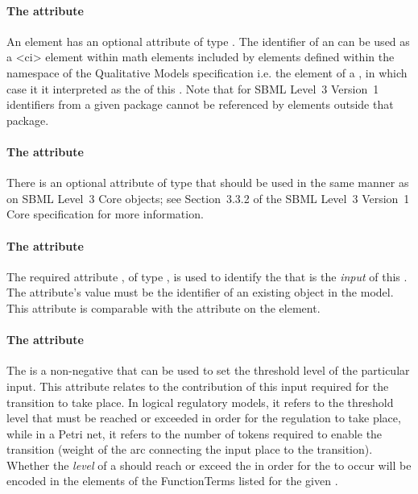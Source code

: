 \paragraph{The  attribute}
An \Input element has an optional  attribute of type . The identifier of an \Input can be used as a 
<ci> element within 
math elements included by elements defined within the namespace of the Qualitative Models specification i.e. the  element of a \FunctionTerm, in which case it it interpreted as the  of this \Input. Note that for SBML Level~3 Version~1 identifiers from a given package cannot be referenced by elements outside that package. 

\paragraph{The  attribute}
There is an optional  attribute of type  that should be used
in the same manner as on SBML Level~3 Core
objects; see Section~3.3.2 of the SBML Level~3 Version~1 Core
specification for more information.


\paragraph{The  attribute}
The required attribute , of type , is used to identify the \QualitativeSpecies that is the \emph{input} of this \Transition.  The attribute's value must be the identifier of an existing \QualitativeSpecies object in the model.  This attribute is comparable with the  attribute on the  element.

\paragraph{The   attribute}
The  is a non-negative  that can be used to set the threshold level of the particular input. This attribute relates to the contribution of this input required for the transition to take place. In logical regulatory models, it refers to the threshold level that must be reached or exceeded in order for the regulation to take place, while in a Petri net, it refers to the number of tokens required to enable the transition (weight of the arc connecting the input place to the transition). Whether the \emph{level} of a \QualitativeSpecies should reach or exceed the  in order for the \Transition to occur will be encoded in the  elements of the FunctionTerms listed for the given \Transition.

